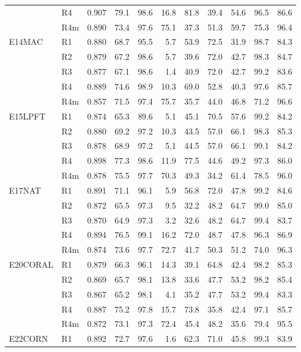 \begin{table}[h]
\begin{tabular}{@{}llrrrrrrrrr@{}}
 & R4 & 0.907 & 79.1 & 98.6 & 16.8 & 81.8 & 39.4 & 54.6 & 96.5 & 86.6 \\
 & R4m & 0.890 & 73.4 & 97.6 & 75.1 & 37.3 & 51.3 & 59.7 & 75.3 & 96.4 \\
\addlinespace
E14MAC & R1 & 0.880 & 68.7 & 95.5 & 5.7 & 53.9 & 72.5 & 31.9 & 98.7 & 84.3 \\
 & R2 & 0.879 & 67.2 & 98.6 & 5.7 & 39.6 & 72.0 & 42.7 & 98.3 & 84.7 \\
 & R3 & 0.877 & 67.1 & 98.6 & 1.4 & 40.9 & 72.0 & 42.7 & 99.2 & 83.6 \\
 & R4 & 0.889 & 74.6 & 98.9 & 10.3 & 69.0 & 52.8 & 40.3 & 97.6 & 85.7 \\
 & R4m & 0.857 & 71.5 & 97.4 & 75.7 & 35.7 & 44.0 & 46.8 & 71.2 & 96.6 \\
\addlinespace
E15LPFT & R1 & 0.874 & 65.3 & 89.6 & 5.1 & 45.1 & 70.5 & 57.6 & 99.2 & 84.2 \\
 & R2 & 0.880 & 69.2 & 97.2 & 10.3 & 43.5 & 57.0 & 66.1 & 98.3 & 85.3 \\
 & R3 & 0.878 & 68.9 & 97.2 & 5.1 & 44.5 & 57.0 & 66.1 & 99.1 & 84.2 \\
 & R4 & 0.898 & 77.3 & 98.6 & 11.9 & 77.5 & 44.6 & 49.2 & 97.3 & 86.0 \\
 & R4m & 0.878 & 75.5 & 97.7 & 70.3 & 49.3 & 34.2 & 61.4 & 78.5 & 96.0 \\
\addlinespace
E17NAT & R1 & 0.891 & 71.1 & 96.1 & 5.9 & 56.8 & 72.0 & 47.8 & 99.2 & 84.6 \\
 & R2 & 0.872 & 65.5 & 97.3 & 9.5 & 32.2 & 48.2 & 64.7 & 99.0 & 85.0 \\
 & R3 & 0.870 & 64.9 & 97.3 & 3.2 & 32.6 & 48.2 & 64.7 & 99.4 & 83.7 \\
 & R4 & 0.894 & 76.5 & 99.1 & 16.2 & 72.0 & 48.7 & 47.8 & 96.3 & 86.9 \\
 & R4m & 0.874 & 73.6 & 97.7 & 72.7 & 41.7 & 50.3 & 51.2 & 74.0 & 96.3 \\
\addlinespace
E20CORAL & R1 & 0.879 & 66.3 & 96.1 & 14.3 & 39.1 & 64.8 & 42.4 & 98.2 & 85.3 \\
 & R2 & 0.869 & 65.7 & 98.1 & 13.8 & 33.6 & 47.7 & 53.2 & 98.2 & 85.4 \\
 & R3 & 0.867 & 65.2 & 98.1 & 4.1 & 35.2 & 47.7 & 53.2 & 99.4 & 83.3 \\
 & R4 & 0.887 & 75.2 & 97.8 & 15.7 & 73.8 & 35.8 & 42.4 & 97.1 & 85.7 \\
 & R4m & 0.872 & 73.1 & 97.3 & 72.4 & 45.4 & 48.2 & 35.6 & 79.4 & 95.5 \\
\addlinespace
E22CORN & R1 & 0.892 & 72.7 & 97.6 & 1.6 & 62.3 & 71.0 & 45.8 & 99.3 & 83.9 \\

\end{tabular}
\end{table}

